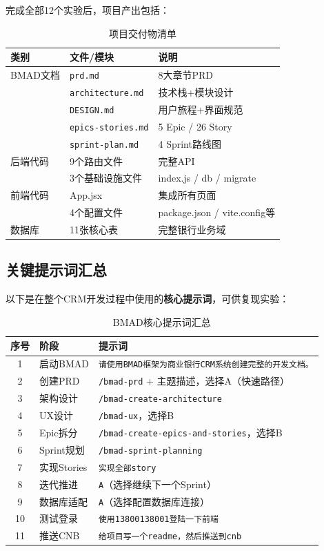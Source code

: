 完成全部12个实验后，项目产出包括：

\begin{table}[H]
\centering
\begin{tabular}{lll}
\toprule
\textbf{类别} & \textbf{文件/模块} & \textbf{说明} \\
\midrule
BMAD文档 & \texttt{prd.md} & 8大章节PRD \\
 & \texttt{architecture.md} & 技术栈+模块设计 \\
 & \texttt{DESIGN.md} & 用户旅程+界面规范 \\
 & \texttt{epics-stories.md} & 5 Epic / 26 Story \\
 & \texttt{sprint-plan.md} & 4 Sprint路线图 \\
\midrule
后端代码 & 9个路由文件 & 完整API \\
 & 3个基础设施文件 & index.js / db / migrate \\
\midrule
前端代码 & App.jsx & 集成所有页面 \\
 & 4个配置文件 & package.json / vite.config等 \\
\midrule
数据库 & 11张核心表 & 完整银行业务域 \\
\bottomrule
\end{tabular}
\caption{项目交付物清单}
\end{table}

\subsection{关键提示词汇总}

以下是在整个CRM开发过程中使用的\textbf{核心提示词}，可供复现实验：

\begin{table}[H]
\centering
\small
\begin{tabular}{clp{8cm}}
\toprule
\textbf{序号} & \textbf{阶段} & \textbf{提示词} \\
\midrule
1 & 启动BMAD & \texttt{请使用BMAD框架为商业银行CRM系统创建完整的开发文档。} \\
2 & 创建PRD & \texttt{/bmad-prd} + 主题描述，选择A（快速路径） \\
3 & 架构设计 & \texttt{/bmad-create-architecture} \\
4 & UX设计 & \texttt{/bmad-ux}，选择B \\
5 & Epic拆分 & \texttt{/bmad-create-epics-and-stories}，选择B \\
6 & Sprint规划 & \texttt{/bmad-sprint-planning} \\
7 & 实现Stories & \texttt{实现全部story} \\
8 & 迭代推进 & \texttt{A}（选择继续下一个Sprint） \\
9 & 数据库适配 & \texttt{A}（选择配置数据库连接） \\
10 & 测试登录 & \texttt{使用13800138001登陆一下前端} \\
11 & 推送CNB & \texttt{给项目写一个readme，然后推送到cnb} \\
\bottomrule
\end{tabular}
\caption{BMAD核心提示词汇总}
\end{table}

